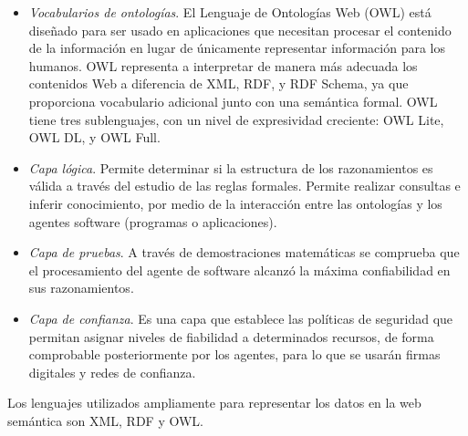 \begin{itemize}
    
    
    \item \textit{Vocabularios de ontolog\'ias}. El Lenguaje de Ontolog\'ias Web (OWL) est\'a diseñado para ser usado en aplicaciones que necesitan procesar el contenido de la informaci\'on en lugar de \'unicamente representar informaci\'on para los humanos. OWL representa a interpretar de manera m\'as adecuada los contenidos Web a diferencia de XML, RDF, y RDF Schema, ya que  proporciona vocabulario adicional junto con una sem\'antica formal. OWL tiene tres sublenguajes, con un nivel de expresividad creciente: OWL Lite, OWL DL, y OWL Full. \cite{LaWebSemantica}
    
    \item \textit{Capa l\'ogica}. Permite determinar si la estructura de los razonamientos es v\'alida a trav\'es del estudio de las reglas formales. Permite realizar consultas e inferir conocimiento, por medio de la interacci\'on entre las ontolog\'ias y los agentes software (programas o aplicaciones). \cite{LaWebSemantica}
    
    \item \textit{Capa de pruebas}. A trav\'es de demostraciones matem\'aticas se comprueba que el procesamiento del agente de software alcanz\'o la m\'axima confiabilidad en sus razonamientos. \cite{LaWebSemantica}
    
    \item \textit{Capa de confianza}. Es una capa que establece las pol\'iticas de seguridad que permitan asignar niveles de fiabilidad a determinados recursos, de forma comprobable posteriormente por los agentes, para lo que se usar\'an firmas digitales y redes de confianza. \cite{LaWebSemantica}

\end{itemize}

Los lenguajes utilizados ampliamente para representar los datos en la web sem\'antica son XML, RDF y OWL.\newline

